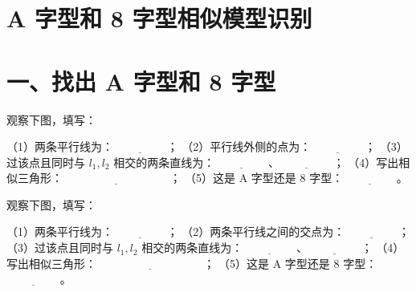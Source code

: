 \documentclass{exam-zh}
\begin{document}
\section*{A 字型和 8 字型相似模型识别}

\section*{一、找出 A 字型和 8 字型}


\begin{problem}[points=10]
  \noindent
  \begin{minipage}[t]{\dimexpr\linewidth-60mm-6mm\relax}
    \vspace{0pt}
    观察下图，填写：

（1）两条平行线为：$\underline{\hspace{2cm}}$；
（2）平行线外侧的点为：$\underline{\hspace{2cm}}$；
（3）过该点且同时与 $l_1,l_2$ 相交的两条直线为：$\underline{\hspace{2cm}}$、$\underline{\hspace{2cm}}$；
（4）写出相似三角形：$\underline{\hspace{4cm}}$；
（5）这是 A 字型还是 8 字型：$\underline{\hspace{2cm}}$。


  \end{minipage}\hfill
  \begin{diagramcoltikz}{60mm}{第 1 题图}
  }
  \end{diagramcoltikz}
  \par\medskip
  \answerarea[42mm]
\end{problem}



\begin{problem}[points=10]
  \noindent
  \begin{minipage}[t]{\dimexpr\linewidth-60mm-6mm\relax}
    \vspace{0pt}
    观察下图，填写：

（1）两条平行线为：$\underline{\hspace{2cm}}$；
（2）两条平行线之间的交点为：$\underline{\hspace{2cm}}$；
（3）过该点且同时与 $l_1,l_2$ 相交的两条直线为：$\underline{\hspace{2cm}}$、$\underline{\hspace{2cm}}$；
（4）写出相似三角形：$\underline{\hspace{4cm}}$；
（5）这是 A 字型还是 8 字型：$\underline{\hspace{2cm}}$。


  \end{minipage}\hfill
  \begin{diagramcoltikz}{60mm}{第 2 题图}
  }
  \end{diagramcoltikz}
  \par\medskip
  \answerarea[42mm]
\end{problem}
\end{document}
